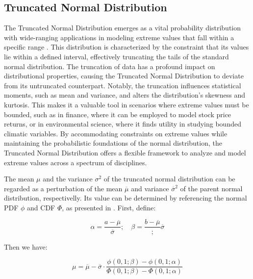 \subsection{Truncated Normal Distribution}

The Truncated Normal Distribution emerges as a vital probability distribution with wide-ranging applications in modeling extreme values that fall within a specific range \cite{burkardt2014truncated}. This distribution is characterized by the constraint that its values lie within a defined interval, effectively truncating the tails of the standard normal distribution. The truncation of data has a profound impact on distributional properties, causing the Truncated Normal Distribution to deviate from its untruncated counterpart. Notably, the truncation influences statistical moments, such as mean and variance, and alters the distribution's skewness and kurtosis. This makes it a valuable tool in scenarios where extreme values must be bounded, such as in finance, where it can be employed to model stock price returns, or in environmental science, where it finds utility in studying bounded climatic variables. By accommodating constraints on extreme values while maintaining the probabilistic foundations of the normal distribution, the Truncated Normal Distribution offers a flexible framework to analyze and model extreme values across a spectrum of disciplines.

The mean $\mu$ and the variance $\sigma^2$ of the truncated normal distribution can be regarded as a perturbation of the mean $\overline{\mu}$ and variance $\overline{\sigma}^2$ of the parent normal distribution, respectivelly. Its value can be determined by referencing the normal PDF $\phi$ and CDF $\Phi$, as
presented in \cite{johnson1995continuous}. First, define:

\begin{equation}
\alpha = \frac{a-\overline{\mu}}{\overline{\sigma}}; \quad \beta = \frac{b-\overline{\mu}};{\overline{\sigma}}
\label{eq:alpha_beta}
\end{equation}

Then we have:

\begin{equation}
\mu = \overline{\mu} - \overline{\sigma} \cdot \frac{\phi(0,1;\beta)-\phi(0,1;\alpha)}{\Phi(0,1;\beta)-\Phi(0,1;\alpha)}
\label{eq:muDef}
\end{equation}

